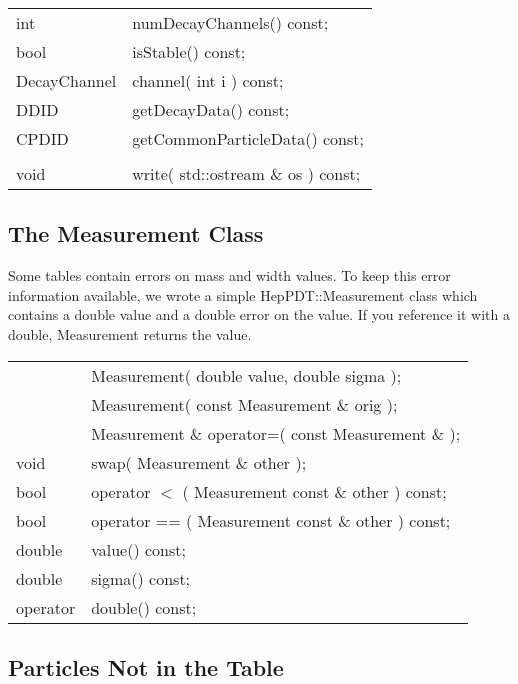 \begin{center}
\begin{tabular}{ll}
 \\
  int                  & numDecayChannels() const; \\
  bool                 & isStable()         const; \\
  DecayChannel  & channel( int i )    const; \\
  DDID   & getDecayData()            const; \\
  CPDID  & getCommonParticleData()   const; \\
   \\
   void & write( std::ostream \& os ) const; \\
\end{tabular}
\end{center}

\subsection{ The Measurement Class }

Some tables contain errors on mass and width values.
To keep this error information available, we wrote a simple HepPDT::Measurement
class which contains a double value and a double error on the value.
If you reference it with a double, Measurement returns the value.

\begin{center}
\begin{tabular}{ll}
 & Measurement( double value, double sigma ); \\
 & Measurement( const Measurement \& orig );  \\
 & Measurement \& operator=( const Measurement \& );  \\
void & swap( Measurement \& other );  \\
bool  & operator $<$  ( Measurement const \& other ) const;  \\
bool   & operator == ( Measurement const \& other ) const;  \\
   double  &  value()  const;\\
   double   & sigma()  const;\\
   operator & double() const;\\
\end{tabular}
\end{center}

\subsection{ Particles Not in the Table }

